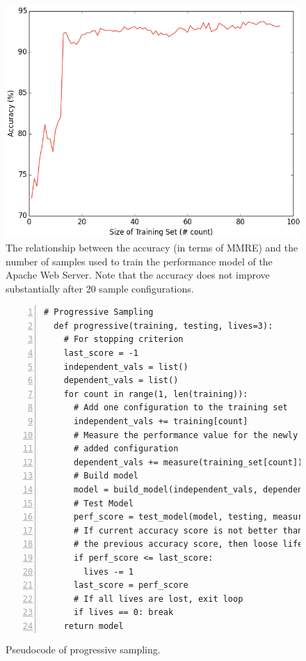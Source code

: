 \begin{figure}[t]
\centering
\includegraphics[scale=0.23]{Chapter-Rank/figures/figure3}
\caption[The relationship between the accuracy and the number of samples used to train the performance model of the Apache Web Server.]{{\small The relationship between the accuracy (in terms of MMRE) and the number of samples used to train the performance model of the Apache Web Server. Note that the accuracy does not improve substantially after 20 sample configurations.}
}
\label{fig:learning_curve}
\end{figure}

\begin{figure}[t]
\small
\hspace{0.2cm}\begin{lstlisting}[xleftmargin=5.0ex,mathescape,frame=none,numbers=left]
  # Progressive Sampling
  def progressive(training, testing, lives=3): 
    # For stopping criterion
    last_score = -1
    independent_vals = list()
    dependent_vals = list()
    for count in range(1, len(training)):    
      # Add one configuration to the training set
      independent_vals += training[count]      
      # Measure the performance value for the newly
      # added configuration 
      dependent_vals += measure(training_set[count])  
      # Build model
      model = build_model(independent_vals, dependent_vals)      
      # Test Model
      perf_score = test_model(model, testing, measure(testing))
      # If current accuracy score is not better than
      # the previous accuracy score, then loose life
      if perf_score <= last_score:
        lives -= 1
      last_score = perf_score
      # If all lives are lost, exit loop
      if lives == 0: break 
    return model
\end{lstlisting}
\caption{\small{Pseudocode of progressive sampling.}}
\label{fig:progressive_sampling}  
\end{figure}

